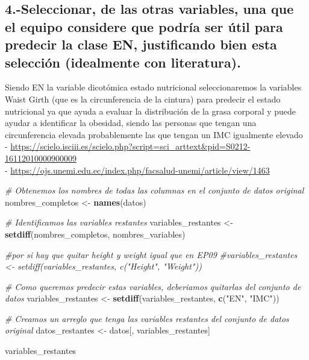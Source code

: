 \documentclass[
]{article}
\newenvironment{Shaded}{\begin{snugshade}}{\end{snugshade}}
\newcommand{\CommentTok}[1]{\textcolor[rgb]{0.56,0.35,0.01}{\textit{#1}}}
\newcommand{\FunctionTok}[1]{\textcolor[rgb]{0.13,0.29,0.53}{\textbf{#1}}}
\newcommand{\NormalTok}[1]{#1}
\newcommand{\OtherTok}[1]{\textcolor[rgb]{0.56,0.35,0.01}{#1}}
\newcommand{\StringTok}[1]{\textcolor[rgb]{0.31,0.60,0.02}{#1}}
\begin{document}
\subsection{4.-Seleccionar, de las otras variables, una que el equipo
considere que podría ser útil para predecir la clase EN, justificando
bien esta selección (idealmente con
literatura).}\label{seleccionar-de-las-otras-variables-una-que-el-equipo-considere-que-podruxeda-ser-uxfatil-para-predecir-la-clase-en-justificando-bien-esta-selecciuxf3n-idealmente-con-literatura.}

Siendo EN la variable dicotómica estado nutricional seleccionaremos la
variables Waist Girth (que es la circunferencia de la cintura) para
predecir el estado nutricional ya que ayuda a evaluar la distribución de
la grasa corporal y puede ayudar a identificar la obesidad, siendo las
personas que tengan una circunferencia elevada probablemente las que
tengan un IMC igualmente elevado\\
-
\url{https://scielo.isciii.es/scielo.php?script=sci_arttext&pid=S0212-16112010000900009}\\
-
\url{https://ojs.unemi.edu.ec/index.php/facsalud-unemi/article/view/1463}

\begin{Shaded}
\begin{Highlighting}[]
\CommentTok{\# Obtenemos los nombres de todas las columnas en el conjunto de datos original}
\NormalTok{nombres\_completos }\OtherTok{\textless{}{-}} \FunctionTok{names}\NormalTok{(datos)}

\CommentTok{\# Identificamos las variables restantes}
\NormalTok{variables\_restantes }\OtherTok{\textless{}{-}} \FunctionTok{setdiff}\NormalTok{(nombres\_completos, nombres\_variables)}

\CommentTok{\#por si hay que quitar height y weight igual que en EP09}
\CommentTok{\#variables\_restantes \textless{}{-} setdiff(variables\_restantes, c("Height", "Weight"))}

\CommentTok{\# Como queremos predecir estas variables, deberiamos quitarlas del conjunto de datos}
\NormalTok{variables\_restantes }\OtherTok{\textless{}{-}} \FunctionTok{setdiff}\NormalTok{(variables\_restantes, }\FunctionTok{c}\NormalTok{(}\StringTok{"EN"}\NormalTok{, }\StringTok{"IMC"}\NormalTok{))}


\CommentTok{\# Creamos un arreglo que tenga las variables restantes del conjunto de datos original}
\NormalTok{datos\_restantes }\OtherTok{\textless{}{-}}\NormalTok{ datos[, variables\_restantes]}



\NormalTok{variables\_restantes}
\end{Highlighting}
\end{Shaded}
\end{document}
